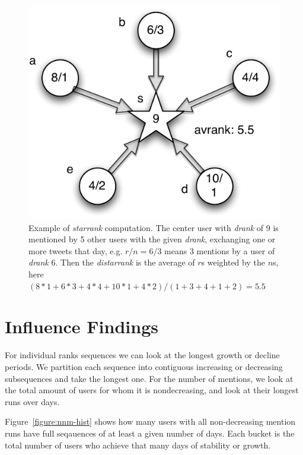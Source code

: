 \documentclass[10pt,oneside]{memoir}
\begin{document}
\begin{Spacing}{2}
\begin{figure}
\begin{center}
\includegraphics{figures/starrank}  
\caption{Example of \emph{starrank} computation.  The center user with \emph{drank} of 9 is mentioned by 5 other users with the given \emph{drank}, exchanging one or more tweets that day, e.g. $r/n=6/3$ means 3 mentions by a user of \emph{drank} 6.  Then the \emph{distarrank} is the average of $r$s weighted by the $n$s, here $(8*1+6*3+4*4+10*1+4*2)/(1+3+4+1+2)=5.5$}
\label{figure:starrank}
\end{center}
\end{figure}
\pagebreak \section{Influence Findings}
\label{influencefindings}

\label{section:influence-findings}


For individual ranks sequences we can look at the longest growth or decline periods.  We partition each sequence into contiguous increasing or decreasing subsequences and take the longest one.  For the number of mentions, we look at the total amount of users for whom it is nondecreasing, and look at their longest runs over days.  


Figure~\ref{figure:nnm-hist} shows how many users with all non-decreasing mention runs have full seqauences of at least a given number of days.  Each bucket is the total number of users who achieve that many days of stability or growth.




\end{Spacing}
\end{document}
